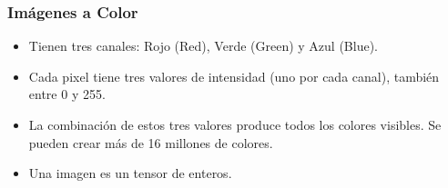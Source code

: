 \documentclass[aspectratio=169, 10pt]{beamer}
\begin{document}
\begin{frame}[fragile]
	\frametitle{Imágenes a Color}
	\begin{itemize}
	\item Tienen tres canales: Rojo (Red), Verde (Green) y Azul (Blue).
	\item Cada pixel tiene tres valores de intensidad (uno por cada canal), también entre 0 y 255.
	\item La combinación de estos tres valores produce todos los colores visibles. Se pueden crear más de 16 millones de colores.
	\item Una imagen es un tensor de enteros.
		\end{itemize}	

\begin{figure}
		\centering
\end{figure}
\end{frame}
\end{document}
